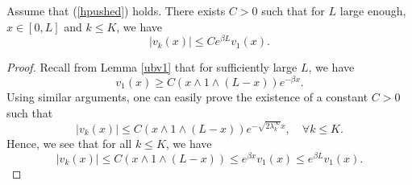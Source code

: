\documentclass[11pt]{article}
\theoremstyle{plain}
\begin{document}
\begin{appendix}
\begin{lem}\label{upperboundratio1}
Assume that (\ref{hpushed}) holds. There exists $C>0$ such that for $L$ large enough, $x\in[0,L]$ and $k\leqslant K$, we have
\begin{equation*}
    \left|v_k(x)\right|\leqslant Ce^{\beta L} v_1(x).
\end{equation*}
\end{lem}
\begin{proof}
Recall from Lemma \ref{ubv1} that for sufficiently large $L$, we have 
\begin{equation*}
v_1(x)\geqslant C(x\wedge 1\wedge (L-x))e^{-\beta x}.
\end{equation*}
Using similar arguments, one can easily prove the existence of a constant $C>0$ such that 
\begin{equation*}
|v_k(x)|\leqslant C(x\wedge 1\wedge (L-x))e^{-\sqrt{2\lambda_k^\infty} x}, \quad \forall k\leq K.
\end{equation*}
Hence, we see that for all $k\leq K$, we have 
\begin{equation*}
|v_k(x)|\leqslant  C(x\wedge 1\wedge (L-x))\leqslant e^{\beta x}v_1(x)\leqslant e^{\beta L}v_1(x).
\end{equation*}
\end{proof}
%
%
%
%

\end{appendix}
\end{document}
